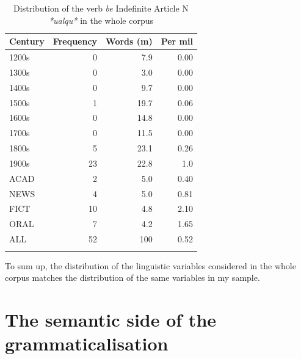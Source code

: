 \begin{table}

\begin{tabular}{lrrr}
\lsptoprule
Century &  Frequency &  Words (m) &  Per mil\\
  \midrule
  1200s& 0& 7.9& 0.00\\
  1300s& 0& 3.0& 0.00\\
  1400s& 0& 9.7& 0.00\\
  1500s& 1& 19.7& 0.06\\
  1600s& 0& 14.8& 0.00\\
  1700s& 0& 11.5& 0.00\\
  1800s& 5& 23.1& 0.26\\
  1900s& 23& 22.8& 1.0\\
  \tablevspace
  ACAD& 2& 5.0& 0.40\\
  NEWS& 4& 5.0& 0.81\\
  FICT& 10& 4.8& 2.10\\
  ORAL & 7    & 4.2  & 1.65\\
  \midrule
  ALL& 52& 100& 0.52\\
  \lspbottomrule
\end{tabular}

\caption{Distribution of the verb \textit{be} Indefinite Article N \textit{*ualqu*} in the whole corpus}
\label{tab:extracted}
\end{table}

To sum up, the distribution of the linguistic variables considered in the whole corpus matches the distribution of the same variables in my sample. 

\section{The semantic side of the grammaticalisation}\label{sec:5.3}

